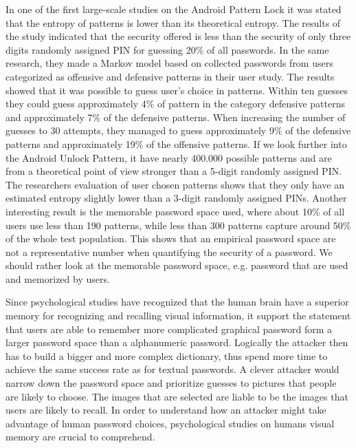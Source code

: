     In one of the first large-scale studies on the Android Pattern Lock \cite{Uellenbeck} it was stated that the entropy of patterns is lower than its theoretical entropy. The results of the study indicated that the security offered is less than the security of only three digits randomly assigned PIN for guessing 20\% of all passwords. In the same research, they made a Markov model based on collected passwords from users categorized as offensive and defensive patterns in their user study. The results showed that it was possible to guess user's choice in patterns. Within ten guesses they could guess approximately 4\% of pattern in the category defensive patterns and approximately 7\% of the defensive patterns. When increasing the number of guesses to 30 attempts, they managed to guess approximately 9\% of the defensive patterns and approximately 19\% of the offensive patterns. If we look further into the Android Unlock Pattern, it have nearly 400.000 possible patterns and are from a theoretical point of view stronger than a 5-digit randomly assigned PIN. The researchers evaluation of user chosen patterns shows that they only have an estimated entropy slightly lower than a 3-digit randomly assigned PINs. Another interesting result is the memorable password space used, where about 10\% of all users use less than 190 patterns, while less than 300 patterns capture around 50\% of the whole test population. This shows that an empirical password space are not a representative number when quantifying the security of a password. We should rather look at the memorable password space, e.g. password that are used and memorized by users.

    Since psychological studies have recognized that the human brain have a superior memory for recognizing and recalling visual information, it support the statement that users are able to remember more complicated graphical password form a larger password space than a alphanumeric password. Logically the attacker then has to build a bigger and more complex dictionary, thus spend more time to achieve the same success rate as for textual passwords. A clever attacker would narrow down the password space and prioritize guesses to pictures that people are likely to choose. The images that are selected are liable to be the images that users are likely to recall. In order to understand how an attacker might take advantage of human password choices, psychological studies on humans visual memory are crucial to comprehend. 
